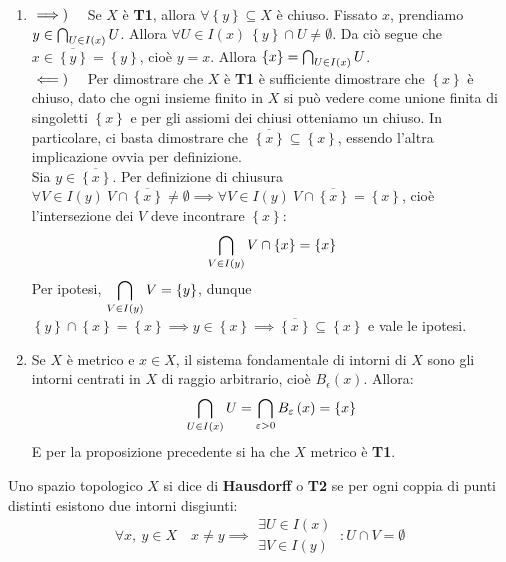 \begin{demonstration}~{}
	\begin{enumerate}[label=\Roman*]
		\item $\implies)\quad$ Se $X$ è \textbf{T1}, allora $\forall \left\{y\right\}\subseteq X$ è chiuso. Fissato $x$, prendiamo $y \in \mathop{{\bigcap}}\displaylimits_{U\in I\left(x\right)}U$. Allora $\forall U\in I\left(x\right)\ \left\{y\right\}\cap U\neq \emptyset$. Da ciò segue che $x\in\overline{\left\{y\right\}}=\left\{y\right\}$, cioè $y=x$. Allora $\left\{x\right\}=\mathop{{\bigcap}}\displaylimits_{U\in I\left(x\right)}U$.\\
		$\impliedby)\quad$ Per dimostrare che $X$ è \textbf{T1} è sufficiente dimostrare che $\left\{x\right\}$ è chiuso, dato che ogni insieme finito in $X$ si può vedere come unione finita di singoletti $\left\{x\right\}$ e per gli assiomi dei chiusi otteniamo un chiuso. In particolare, ci basta dimostrare che $\overline{\left\{x\right\}}\subseteq \left\{x\right\}$, essendo l'altra implicazione ovvia per definizione.\\
		Sia $y\in\overline{\left\{x\right\}}$. Per definizione di chiusura $\forall V\in I\left(y\right)\ V\cap\overline{\left\{x\right\}}\neq\emptyset\implies \forall V\in I\left(y\right)\ V\cap\overline{\left\{x\right\}}=\left\{x\right\}$, cioè l'intersezione dei $V$ deve incontrare $\left\{x\right\}$:
		\begin{equation*}
			\mathop{{\bigcap}}\displaylimits_{V\in I\left(y\right)}V\cap\left\{x\right\}=\left\{x\right\}
		\end{equation*}
		Per ipotesi, $\displaystyle \mathop{{\bigcap}}\displaylimits_{V\in I\left(y\right)}V=\left\{y\right\}$, dunque $\left\{y\right\}\cap \left\{x\right\}=\left\{x\right\}\implies y\in\left\{x\right\}\implies\overline{\left\{x\right\}}\subseteq \left\{x\right\}$ e vale le ipotesi.
		\item Se $X$ è metrico e $x\in X$, il sistema fondamentale di intorni di $X$ sono gli intorni centrati in $X$ di raggio arbitrario, cioè $B_{\epsilon}\left(x\right)$. Allora:
		\begin{equation*}
			\mathop{{\bigcap}}\displaylimits_{U\in I\left(x\right)}U=\mathop{{\bigcap}}\displaylimits_{\varepsilon > 0}B_{\varepsilon}\left(x\right)=\left\{x\right\}
		\end{equation*}
		E per la proposizione precedente si ha che $X$ metrico è \textbf{T1}.
	\end{enumerate}
\end{demonstration}
\begin{define}
	Uno spazio topologico $X$ si dice di \textbf{Hausdorff} o \textbf{T2} se per ogni coppia di punti distinti esistono due intorni disgiunti:
	\begin{equation}
		\forall x,\ y\in X\quad x\neq y\implies
		\begin{array}{l}
			\exists U\in I\left(x\right)\\
			\exists V\in I\left(y\right)
		\end{array}
		\ \colon U\cap V=\emptyset
	\end{equation}
\end{define}
